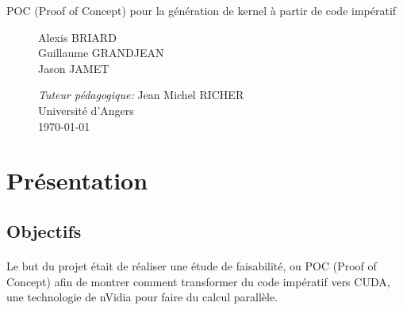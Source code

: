 \documentclass{article}
\begin{document}
\begin{titlepage}
\begin{center}
\begin{Huge}
			\end{Huge}
			\begin{Large}
				POC (Proof of Concept) pour la génération de kernel à partir de code impératif
			\end{Large}		
			 
		\end{center}
		
		
  		\begin{figure}[b]
  		 \begin{minipage}{0.4\textwidth}
			\begin{flushleft} \large
				Alexis BRIARD\\
				Guillaume GRANDJEAN\\
				Jason JAMET
    		\end{flushleft}
    		\end{minipage}
    		\begin{minipage}{0.6\textwidth}
			\begin{flushright} \large
				\emph{Tuteur pédagogique:} Jean Michel RICHER\\				
        		Université d'Angers\\
        		\today
    		\end{flushright}
    	\end{minipage}
		\end{figure}

    	
	\end{titlepage}

\newpage
\thispagestyle{empty}
\mbox{}
\setcounter{page}{0}
\glsresetall
\newpage
\tableofcontents
\newpage

	\section{Présentation}

	\subsection{Objectifs}

	\paragraph{}
	Le but du projet était de réaliser une étude de faisabilité, ou POC (Proof of Concept) afin de montrer comment transformer du code impératif vers CUDA, une technologie de nVidia pour faire du calcul parallèle.
	
\end{document}
